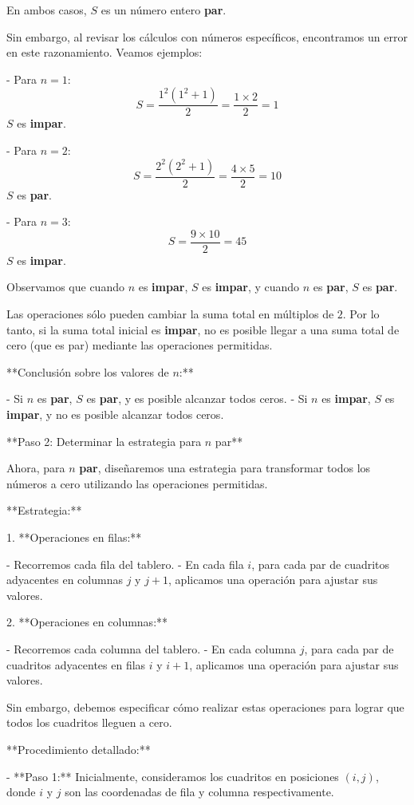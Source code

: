 \documentclass[11pt]{scrartcl}
\begin{document}
\begin{problem}
\begin{hint}
\begin{solu}
En ambos casos, $S$ es un número entero \textbf{par}.

Sin embargo, al revisar los cálculos con números específicos, encontramos un error en este razonamiento. Veamos ejemplos:

- Para $n = 1$:
  $$
  S = \frac{1^2 (1^2 + 1)}{2} = \frac{1 \times 2}{2} = 1
  $$
  $S$ es \textbf{impar}.

- Para $n = 2$:
  $$
  S = \frac{2^2 (2^2 + 1)}{2} = \frac{4 \times 5}{2} = 10
  $$
  $S$ es \textbf{par}.

- Para $n = 3$:
  $$
  S = \frac{9 \times 10}{2} = 45
  $$
  $S$ es \textbf{impar}.

Observamos que cuando $n$ es \textbf{impar}, $S$ es \textbf{impar}, y cuando $n$ es \textbf{par}, $S$ es \textbf{par}.

Las operaciones sólo pueden cambiar la suma total en múltiplos de $2$. Por lo tanto, si la suma total inicial es \textbf{impar}, no es posible llegar a una suma total de cero (que es par) mediante las operaciones permitidas.

**Conclusión sobre los valores de $n$:**

- Si $n$ es \textbf{par}, $S$ es \textbf{par}, y es posible alcanzar todos ceros.
- Si $n$ es \textbf{impar}, $S$ es \textbf{impar}, y no es posible alcanzar todos ceros.

**Paso 2: Determinar la estrategia para $n$ par**

Ahora, para $n$ \textbf{par}, diseñaremos una estrategia para transformar todos los números a cero utilizando las operaciones permitidas.

**Estrategia:**

1. **Operaciones en filas:**

   - Recorremos cada fila del tablero.
   - En cada fila $i$, para cada par de cuadritos adyacentes en columnas $j$ y $j+1$, aplicamos una operación para ajustar sus valores.

2. **Operaciones en columnas:**

   - Recorremos cada columna del tablero.
   - En cada columna $j$, para cada par de cuadritos adyacentes en filas $i$ y $i+1$, aplicamos una operación para ajustar sus valores.

Sin embargo, debemos especificar cómo realizar estas operaciones para lograr que todos los cuadritos lleguen a cero.

**Procedimiento detallado:**

- **Paso 1:** Inicialmente, consideramos los cuadritos en posiciones $(i, j)$, donde $i$ y $j$ son las coordenadas de fila y columna respectivamente.


\end{solu}
\end{hint}
\end{problem}
\end{document}
